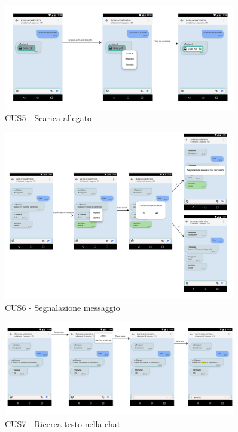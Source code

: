 \begin{figure}
	\centering
	\includegraphics[width=0.9\textwidth]{imgs/gruppo6/activities/act_cus5_scarica_allegato.pdf}
	\caption{CUS5 - Scarica allegato}
	\label{fig:act-cus5}
\end{figure}

\begin{figure}
	\centering
	\includegraphics[width=0.9\textwidth]{imgs/gruppo6/activities/act_cus6_segnalazione_messaggio.pdf}
	\caption{CUS6 - Segnalazione messaggio}
	\label{fig:act-cus6}
\end{figure}

\begin{figure}
	\centering
	\includegraphics[width=0.9\textwidth]{imgs/gruppo6/activities/act_cus7_ricerca_testo_nella_chat.pdf}
	\caption{CUS7 - Ricerca testo nella chat}
	\label{fig:act-cus7}
\end{figure}

